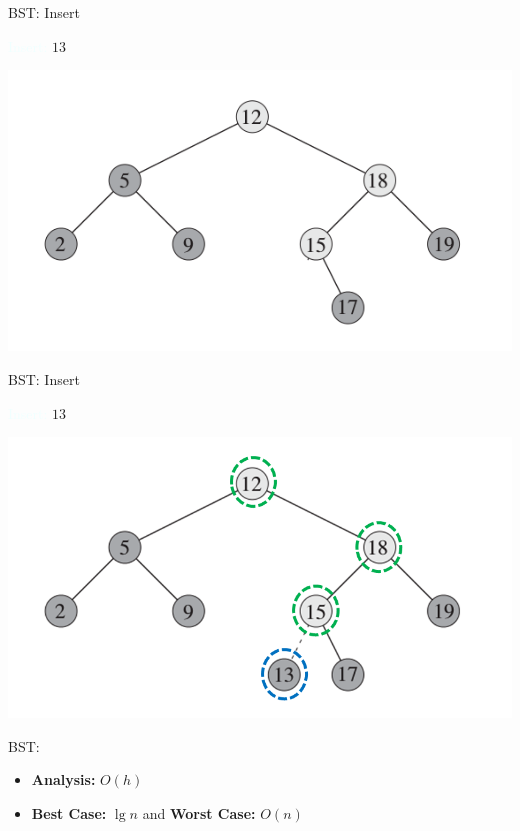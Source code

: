 \documentclass{beamer}
\newcommand{\tblue}[1]{{\Large {\textcolor{azure}{#1}}}}
\begin{document}
\begin{frame}{BST: Insert}

\tblue{Insert:} $13$
    \begin{center}
        \includegraphics[scale=0.5]{bstInsert.png}
    \end{center}
\end{frame}


\begin{frame}{BST: Insert}

\tblue{Insert:} $13$
    \begin{center}
        \includegraphics[scale=0.5]{bstInsert2.png}
    \end{center}
\end{frame}

\begin{frame}[fragile]{BST: }
    \begin{itemize}
        \item {\bf Analysis:} \pause $O(h)$ 
        \item {\bf Best Case:} $\lg n$ and {\bf Worst Case:} $O(n)$
    \end{itemize}
\end{frame}
\end{document}
